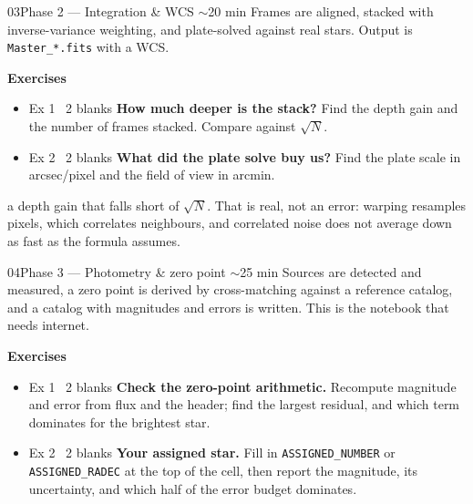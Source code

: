 \documentclass[11pt,a4paper]{article}
\newcommand{\recordline}[2]{%
  \vspace{6pt}{\color{rule}\hrule}\vspace{6pt}%
  \noindent{\sffamily\bfseries\scriptsize\color{accent}\MakeUppercase{#1}}\hspace{6pt}%
  \begin{minipage}[t]{0.78\textwidth}\small #2\end{minipage}}
\begin{document}
\begin{nbbox}{03}{Phase 2 --- Integration \& WCS \quad\textnormal{\sffamily\scriptsize\color{inkfaint}$\sim$20 min}}
\small\color{inksoft} Frames are aligned, stacked with inverse-variance weighting, and
plate-solved against real stars. Output is \texttt{Master\_*.fits} with a WCS.
\par\vspace{6pt}\color{ink}
{\sffamily\bfseries\small Exercises}
\begin{itemize}
\item[] {\ttfamily\scriptsize\color{inkfaint}Ex 1 \textbullet\ 2 blanks}\quad
\textbf{How much deeper is the stack?} Find the depth gain and the number of frames stacked.
Compare against $\sqrt{N}$.
\item[] {\ttfamily\scriptsize\color{inkfaint}Ex 2 \textbullet\ 2 blanks}\quad
\textbf{What did the plate solve buy us?} Find the plate scale in arcsec/pixel and the field of
view in arcmin.
\end{itemize}
\recordline{Watch for}{a depth gain that falls short of $\sqrt{N}$. That is real, not an
error: warping resamples pixels, which correlates neighbours, and correlated noise does not
average down as fast as the formula assumes.}
\end{nbbox}

\begin{nbbox}{04}{Phase 3 --- Photometry \& zero point \quad\textnormal{\sffamily\scriptsize\color{inkfaint}$\sim$25 min}}
\small\color{inksoft} Sources are detected and measured, a zero point is derived by
cross-matching against a reference catalog, and a catalog with magnitudes and errors is
written. This is the notebook that needs internet.
\par\vspace{6pt}\color{ink}
{\sffamily\bfseries\small Exercises}
\begin{itemize}
\item[] {\ttfamily\scriptsize\color{inkfaint}Ex 1 \textbullet\ 2 blanks}\quad
\textbf{Check the zero-point arithmetic.} Recompute magnitude and error from flux and the
header; find the largest residual, and which term dominates for the brightest star.
\item[] {\ttfamily\scriptsize\color{inkfaint}Ex 2 \textbullet\ 2 blanks}\quad
\textbf{Your assigned star.} Fill in \texttt{ASSIGNED\_NUMBER} or \texttt{ASSIGNED\_RADEC} at
the top of the cell, then report the magnitude, its uncertainty, and which half of the error
budget dominates.
\end{itemize}
\end{nbbox}
\end{document}
